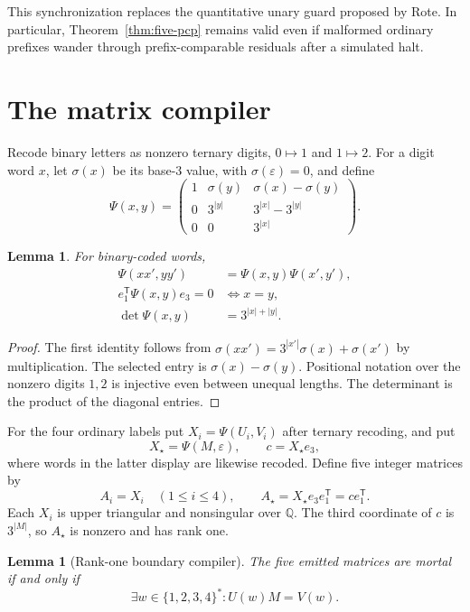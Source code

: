 \documentclass[11pt]{article}
\newtheorem{lemma}[theorem]{Lemma}
\newcommand{\Q}{\mathbb Q}
\newcommand{\eps}{\varepsilon}
\begin{document}
This synchronization replaces the quantitative unary guard proposed by Rote.  In particular,
Theorem~\ref{thm:five-pcp} remains valid even if malformed ordinary prefixes wander through
prefix-comparable residuals after a simulated halt.

\section{The matrix compiler}

Recode binary letters as nonzero ternary digits, $0\mapsto1$ and $1\mapsto2$.  For a digit
word $x$, let $\sigma(x)$ be its base-$3$ value, with $\sigma(\eps)=0$, and define
\[
\Psi(x,y)=
\begin{pmatrix}
1 & \sigma(y) & \sigma(x)-\sigma(y)\\
0 & 3^{|y|} & 3^{|x|}-3^{|y|}\\
0 & 0 & 3^{|x|}
\end{pmatrix}.
\]

\begin{lemma}\label{lem:morphism}
For binary-coded words,
\begin{align*}
 \Psi(xx',yy')&=\Psi(x,y)\Psi(x',y'),\\
 e_1^{\mathsf T}\Psi(x,y)e_3=0&\Longleftrightarrow x=y,\\
 \det\Psi(x,y)&=3^{|x|+|y|}.
\end{align*}
\end{lemma}

\begin{proof}
The first identity follows from
$\sigma(xx')=3^{|x'|}\sigma(x)+\sigma(x')$ by multiplication.  The selected entry is
$\sigma(x)-\sigma(y)$.  Positional notation over the nonzero digits $1,2$ is injective even
between unequal lengths.  The determinant is the product of the diagonal entries.
\end{proof}

For the four ordinary labels put $X_i=\Psi(U_i,V_i)$ after ternary recoding, and put
\[
  X_\star=\Psi(M,\eps),\qquad c=X_\star e_3,
\]
where words in the latter display are likewise recoded.  Define five integer matrices by
\[
  A_i=X_i\quad(1\leq i\leq4),
  \qquad A_\star=X_\star e_3e_1^{\mathsf T}=ce_1^{\mathsf T}.
\]
Each $X_i$ is upper triangular and nonsingular over $\Q$.  The third coordinate of $c$ is
$3^{|M|}$, so $A_\star$ is nonzero and has rank one.

\begin{lemma}[Rank-one boundary compiler]\label{lem:matrix}
The five emitted matrices are mortal if and only if
\[
  \exists w\in\{1,2,3,4\}^*:U(w)M=V(w).
\]
\end{lemma}
\end{document}
